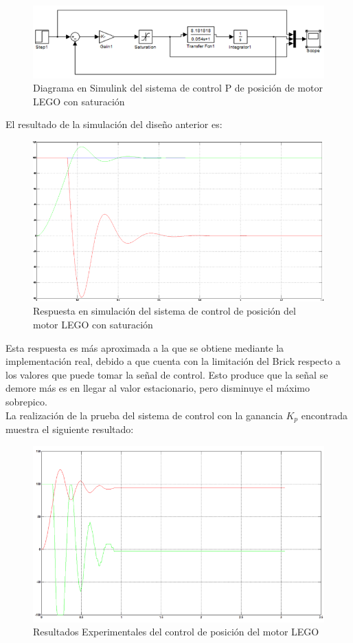 \documentclass[twocolumn]{IEEEtran}
\begin{document}
\begin{figure}[H]
	\centering
		\includegraphics[scale=0.35]{tf32.png}
	\caption{Diagrama en Simulink del sistema de control P de posición de motor LEGO con saturación}
	\label{fig9}
\end{figure}
\noindent
El resultado de la simulación del diseño anterior es:
\begin{figure}[H]
	\centering
		\includegraphics[scale=0.33]{salida4.png}
	\caption{Respuesta en simulación del sistema de control de posición del motor LEGO con saturación}
	\label{fig10}
\end{figure}
\noindent
Esta respuesta es más aproximada a la que se obtiene mediante la implementación real, debido a que cuenta con la limitación del Brick respecto a los valores que puede tomar la señal de control. Esto produce que la señal se demore más es en llegar al valor estacionario, pero disminuye el máximo sobrepico.\\
La realización de la prueba del sistema de control con la ganancia $K_p$ encontrada muestra el siguiente resultado:
\begin{figure}[H]
	\centering
		\includegraphics[scale=0.33]{salida5.png}
	\caption{Resultados Experimentales del control de posición del motor LEGO}
	\label{fig11}
\end{figure}
\end{document}
